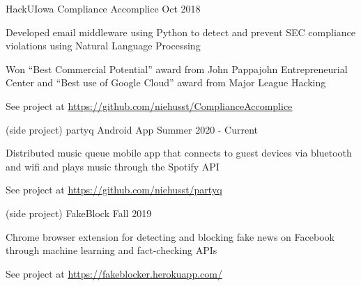 \documentclass[12pt, a4paper]{awesome-cv}
\begin{document}
\begin{cventries}

    \cventry
	{HackUIowa}
 	{Compliance Accomplice}
	{Oct 2018}
	{}
	{
	  \begin{cvitems}
	     \item{Developed email middleware using Python to detect and prevent SEC compliance violations using Natural Language Processing}
	     \item{Won “Best Commercial Potential” award from John Pappajohn Entrepreneurial Center and “Best use of Google Cloud” award from Major League Hacking}
	     \item{See project at \underline{\href{https://github.com/niehusst/ComplianceAccomplice}{https://github.com/niehusst/ComplianceAccomplice}}} 
	  \end{cvitems}
	}

  \cventry
    {(side project)}
    {partyq Android App}
    {Summer 2020 - Current}
    {}
    {
      \begin{cvitems}
        \item{Distributed music queue mobile app that connects to guest devices via bluetooth and wifi and plays music through the Spotify API}
        \item{See project at \underline{\href{https://github.com/niehusst/partyq}{https://github.com/niehusst/partyq}}}
      \end{cvitems}
    }

  \cventry
    {(side project)}
    {FakeBlock}
    {Fall 2019}
    {}
    {
      \begin{cvitems}
        \item{Chrome browser extension for detecting and blocking fake news on Facebook through machine learning and fact-checking APIs}
        \item{See project at \underline{\href{https://fakeblocker.herokuapp.com/}{https://fakeblocker.herokuapp.com/}}}
      \end{cvitems}
    }



\end{cventries}
\end{document}
